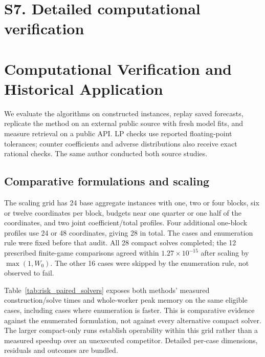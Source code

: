 \FloatBarrier
\section{S7. Detailed computational verification}
\section{Computational Verification and Historical Application}
\label{sec:evaluation}
We evaluate the algorithms on constructed instances, replay saved forecasts,
replicate the method on an external public source with fresh model fits,
and measure retrieval on a public API. LP checks use reported floating-point
tolerances; counter coefficients and adverse distributions also receive
exact rational checks. The same author conducted both source studies.

\subsection{Comparative formulations and scaling}
The scaling grid has 24 base aggregate instances with one, two or four
blocks, six or twelve coordinates per block, budgets near one quarter or
one half of the coordinates, and two joint coefficient/total profiles.
Four additional one-block profiles use 24 or 48 coordinates, giving 28 in total. The cases
and enumeration rule were fixed before that audit. All 28 compact solves
completed; the 12 prescribed finite-game comparisons agreed within
$1.27\times10^{-15}$ after scaling by $\max(1,W_0)$. The other 16 cases
were skipped by the enumeration rule, not observed to fail.

Table~\ref{tab:risk_paired_solvers} exposes both methods' measured
construction/solve times and whole-worker peak memory on the same eligible
cases, including cases where enumeration is faster. This is comparative
evidence against the enumerated formulation, not against every alternative
compact solver. The larger compact-only runs establish operability within
this grid rather than a measured speedup over an unexecuted competitor.
Detailed per-case dimensions, residuals and outcomes are bundled.

